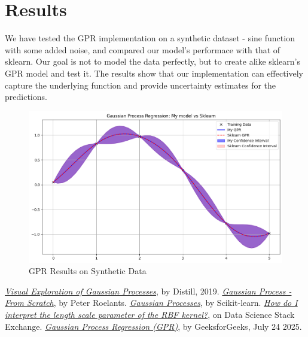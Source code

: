 \documentclass{article}
\begin{document}
\section{Results}
\label{sec:results}
We have tested the GPR implementation on a synthetic dataset - sine function with some added noise, and compared our model's performace with that of sklearn. Our goal is not to model the data perfectly, but to create alike sklearn's GPR model and test it. The results show that our implementation can effectively capture the underlying function and provide uncertainty estimates for the predictions.
\begin{figure}[H]
    \centering
    \includegraphics[width=1\textwidth]{images/sine.png}
    \caption{GPR Results on Synthetic Data}
    \label{fig:gpr_results}
\end{figure}

\begin{thebibliography}{9}
\href{https://distill.pub/2019/visual-exploration-gaussian-process/#Multivariate}{\textit{Visual Exploration of Gaussian Processes}}, by Distill, 2019.
\href{https://peterroelants.github.io/posts/gaussian-process-tutorial/}{\textit{Gaussian Process - From Scratch}}, by Peter Roelants.
\href{https://scikit-learn.org/stable/modules/gaussian_process.html}{\textit{Gaussian Processes}}, by Scikit-learn.
\href{https://datascience.stackexchange.com/questions/31947/how-do-i-interpret-the-length-scale-parameter-of-the-rbf-kernel}{\textit{How do I interpret the length scale parameter of the RBF kernel?}}, on Data Science Stack Exchange.
\href{https://www.geeksforgeeks.org/machine-learning/gaussian-process-regression-gpr/}{\textit{Gaussian Process Regression (GPR)}}, by GeeksforGeeks, July 24 2025.
\end{thebibliography}
\end{document}
